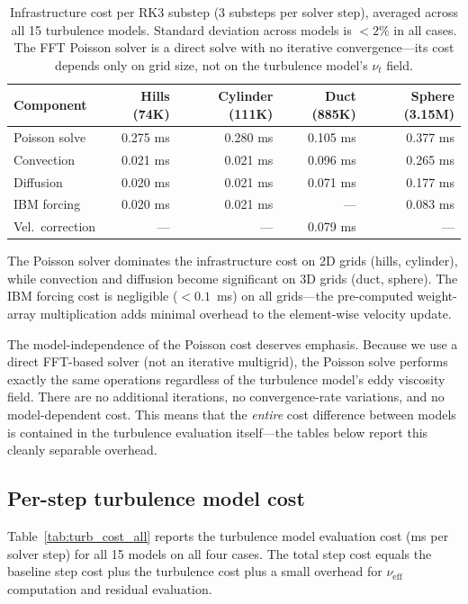 \begin{table}[htbp]
\centering
\caption{Infrastructure cost per RK3 substep (3 substeps per solver step), averaged across all 15 turbulence models. Standard deviation across models is $<2\%$ in all cases. The FFT Poisson solver is a direct solve with no iterative convergence---its cost depends only on grid size, not on the turbulence model's $\nu_t$ field.}
\label{tab:infrastructure_cost}
\begin{tabular}{lrrrr}
\toprule
Component & Hills (74K) & Cylinder (111K) & Duct (885K) & Sphere (3.15M) \\
\midrule
Poisson solve     & 0.275 ms & 0.280 ms & 0.105 ms & 0.377 ms \\
Convection        & 0.021 ms & 0.021 ms & 0.096 ms & 0.265 ms \\
Diffusion         & 0.020 ms & 0.021 ms & 0.071 ms & 0.177 ms \\
IBM forcing       & 0.020 ms & 0.021 ms & ---      & 0.083 ms \\
Vel.\ correction  & ---      & ---      & 0.079 ms & ---      \\
\bottomrule
\end{tabular}
\end{table}

The Poisson solver dominates the infrastructure cost on 2D grids (hills, cylinder), while convection and diffusion become significant on 3D grids (duct, sphere).
The IBM forcing cost is negligible ($< 0.1$~ms) on all grids---the pre-computed weight-array multiplication adds minimal overhead to the element-wise velocity update.

The model-independence of the Poisson cost deserves emphasis.
Because we use a direct FFT-based solver (not an iterative multigrid), the Poisson solve performs exactly the same operations regardless of the turbulence model's eddy viscosity field.
There are no additional iterations, no convergence-rate variations, and no model-dependent cost.
This means that the \emph{entire} cost difference between models is contained in the turbulence evaluation itself---the tables below report this cleanly separable overhead.

\subsection{Per-step turbulence model cost}
\label{sec:cost:perstep}

Table~\ref{tab:turb_cost_all} reports the turbulence model evaluation cost (ms per solver step) for all 15 models on all four cases.
The total step cost equals the baseline step cost plus the turbulence cost plus a small overhead for $\nu_\mathrm{eff}$ computation and residual evaluation.

